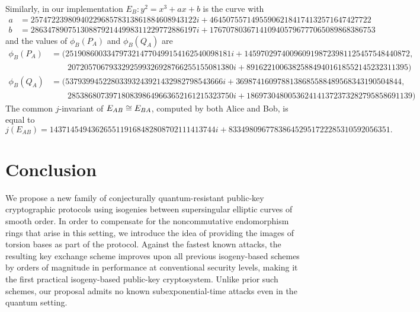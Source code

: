 Similarly, in our implementation $E_B : y^2 = x^3 + ax
+ b$ is the curve with
{\tiny
\begin{align*}
a &= 2574722398094022968578313861884608943122 i + 464507557149559062184174132571647427722 \\
b &= 2863478907513088792144998311229772886197 i + 1767078036714109405796777065089868386753
\end{align*}
}
and the values of $\phi_B(P_A)$ and $\phi_B(Q_A)$ are
{\tiny
\begin{align*}
\phi_B(P_A) &=
(2519086003347973214770499154162540098181 i + 
    1459702974009609198723981125457548440872, \\
    & \qquad 2072057067933292599326928766255155081380 i + 
    891622100638258849401618552145232311395)
\\
\phi_B(Q_A) &=
(53793994522803393243921432982798543666 i + 
    3698741609788138685588489568343190504844, \\
    & \qquad 2853868073971808398649663652161215323750 i + 
    1869730480053624141372373282795858691139)
\end{align*}
}The common $j$-invariant of $E_{AB} \cong E_{BA}$, computed by both
Alice and Bob, is equal to
{\tiny
\[
j(E_{AB}) = 1437145494362655119168482808702111413744 i +
833498096778386452951722285310592056351.\]
}

\section{Conclusion}

We propose a new family of conjecturally quantum-resistant public-key
cryptographic protocols using isogenies between supersingular elliptic
curves of smooth order. In order to compensate for the noncommutative
endomorphism rings that arise in this setting, we introduce the idea
of providing the images of torsion bases as part of the
protocol. Against the fastest known attacks, the resulting key
exchange scheme improves upon all previous isogeny-based schemes by
orders of magnitude in performance at conventional security levels,
making it the first practical isogeny-based public-key cryptosystem.
Unlike prior such schemes, our proposal admits no known
subexponential-time attacks even in the quantum setting.


